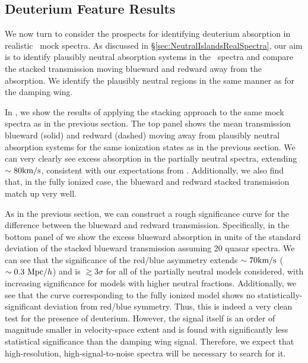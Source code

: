 \subsection{Deuterium Feature Results} \label{sec:NeutralIslandsDeuteriumResults}


We now turn to consider the prospects for identifying deuterium absorption in realistic \lyb\ mock spectra. As discussed in \S \ref{sec:NeutralIslandsRealSpectra}, our aim is to identify plausibly neutral absorption systems in the \lyb\ spectra and compare the stacked transmission moving blueward and redward away from the absorption. We identify the plausibly neutral regions in the same manner as for the damping wing.

In , we show the results of applying the stacking approach to the same mock spectra as in the previous section. The top panel shows the mean transmission blueward (solid) and redward (dashed) moving away from plausibly neutral absorption systems for the same ionization states as in the previous section. We can very clearly see excess absorption in the partially neutral spectra, extending $\sim 80\text{km}/\text{s}$, consistent with our expectations from . Additionally, we also find that, in the fully ionized case, the blueward and redward stacked transmission match up very well. 


As in the previous section, we can construct a rough significance curve for the difference between the blueward and redward transmission. Specifically, in the bottom panel of  we show the excess blueward absorption in units of the standard deviation of the stacked blueward transmission assuming 20 quasar spectra. We can see that the significance of the red/blue asymmetry extends $\sim 70\text{km}/\text{s}$ ($\sim 0.3 \ \text{Mpc/$h$}$) and is $\gtrsim 3\sigma$ for all of the partially neutral models considered, with increasing significance for models with higher neutral fractions. Additionally, we see that the curve corresponding to the fully ionized model shows no statistically-significant deviation from red/blue symmetry. Thus, this is indeed a very clean test for the presence of deuterium. However, the signal itself is an order of magnitude smaller in velocity-space extent and is found with significantly less statistical significance than the damping wing signal. Therefore, we expect that high-resolution, high-signal-to-noise spectra will be necessary to search for it. 


